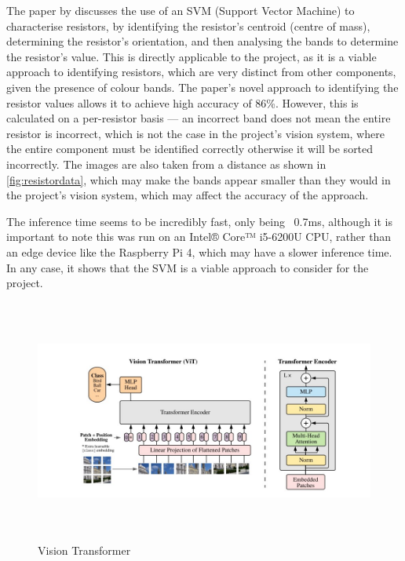 The paper by \citet{8939034} discusses the use of an SVM (Support Vector Machine) to characterise resistors, by identifying the resistor's centroid (centre of mass), determining the resistor's orientation, and then analysing the bands to determine the resistor's value. This is directly applicable to the project, as it is a viable approach to identifying resistors, which are very distinct from other components, given the presence of colour bands. The paper's novel approach to identifying the resistor values allows it to achieve high accuracy of 86\%. However, this is calculated on a per-resistor basis --- an incorrect band does not mean the entire resistor is incorrect, which is not the case in the project's vision system, where the entire component must be identified correctly otherwise it will be sorted incorrectly. The images are also taken from a distance as shown in \autoref{fig:resistordata}, which may make the bands appear smaller than they would in the project's vision system, which may affect the accuracy of the approach.

The inference time seems to be incredibly fast, only being ~0.7ms, although it is important to note this was run on an Intel® Core™ i5-6200U CPU, rather than an edge device like the Raspberry Pi 4, which may have a slower inference time. In any case, it shows that the SVM is a viable approach to consider for the project.

\begin{figure}[H]
  \hfill
  \begin{minipage}[t]{\textwidth}
    \centering
    \includegraphics[height=8cm]{imgs/articles/visiontransformer.jpg}
    \caption{Vision Transformer \cite{dosovitskiy2021image}}
    \label{fig:visiontransformer}
  \end{minipage}
\end{figure}

